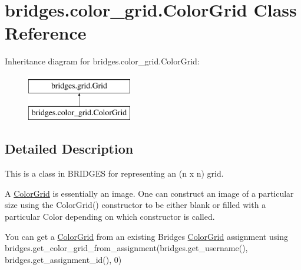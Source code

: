 \hypertarget{classbridges_1_1color__grid_1_1_color_grid}{}\section{bridges.\+color\+\_\+grid.\+Color\+Grid Class Reference}
\label{classbridges_1_1color__grid_1_1_color_grid}
Inheritance diagram for bridges.\+color\+\_\+grid.\+Color\+Grid\+:\begin{figure}[H]
\begin{center}
\leavevmode
\includegraphics[height=2.000000cm]{classbridges_1_1color__grid_1_1_color_grid}
\end{center}
\end{figure}


\subsection{Detailed Description}
This is a class in B\+R\+I\+D\+G\+ES for representing an (n x n) grid. 

A \mbox{\hyperlink{classbridges_1_1color__grid_1_1_color_grid}{Color\+Grid}} is essentially an image. One can construct an image of a particular size using the Color\+Grid() constructor to be either blank or filled with a particular Color depending on which constructor is called.


\begin{DoxyCode}{0}
\end{DoxyCode}


You can get a \mbox{\hyperlink{classbridges_1_1color__grid_1_1_color_grid}{Color\+Grid}} from an existing Bridges \mbox{\hyperlink{classbridges_1_1color__grid_1_1_color_grid}{Color\+Grid}} assignment using bridges.\+get\+\_\+color\+\_\+grid\+\_\+from\+\_\+assignment(bridges.\+get\+\_\+username(), bridges.\+get\+\_\+assignment\+\_\+id(), 0)

